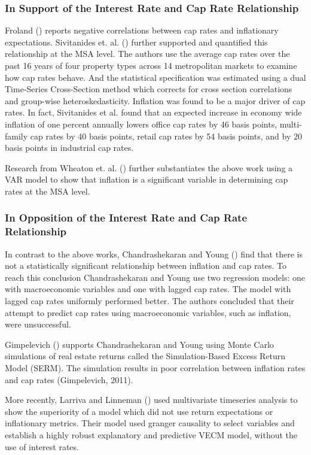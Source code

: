 \subsubsection{In Support of the Interest Rate and Cap Rate Relationship}
Froland (\citeyear{froland1987determines}) reports negative correlations between cap rates and inflationary expectations. Sivitanides et. al. (\citeyear{sivitanides2001determinants}) further supported and quantified this relationship at the MSA level. The authors use the average cap rates over the past 16 years of four property types across 14 metropolitan markets to examine how cap rates behave. And the statistical specification was estimated using a dual Time-Series Cross-Section method which corrects for cross section correlations and group-wise heteroskedasticity. Inflation was found to be a major driver of cap rates. In fact, Sivitanides et al. found that an expected increase in economy wide inflation of one percent annually lowers office cap rates by 46 basis points, multi-family cap rates by 40 basis points, retail cap rates by 54 basis points, and by 20 basis points in industrial cap rates.

Research from Wheaton et. al. (\citeyear{wheaton2001real}) further substantiates the above work using a VAR model to show that inflation is a significant variable in determining cap rates at the MSA level. 

\subsubsection{In Opposition of the Interest Rate and Cap Rate Relationship}
In contrast to the above works, Chandrashekaran and Young (\citeyear{chandrashekaran2000predictability}) find that there is not a statistically significant relationship between inflation and cap rates. To reach this conclusion Chandrashekaran and Young use two regression models: one with macroeconomic variables and one with lagged cap rates. The model with lagged cap rates uniformly performed better. The authors concluded that their attempt to predict cap rates using macroeconomic variables, such as inflation, were unsuccessful. 

Gimpelevich (\citeyear{Gimpelevich2011}) supports Chandrashekaran and Young using Monte Carlo simulations of real estate returns called the Simulation-Based Excess Return Model (SERM). The simulation results in poor correlation between inflation rates and cap rates (Gimpelevich, 2011).

More recently, Larriva and Linneman (\citeyear{larriva2021determinants}) used multivariate timeseries analysis to show the superiority of a model which did not use return expectations or inflationary metrics. Their model used granger causality to select variables and establish a highly robust explanatory and predictive VECM model, without the use of interest rates.

